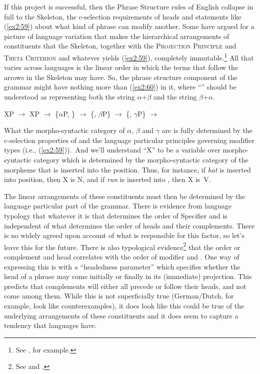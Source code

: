 If this project is successful, then the Phrase Structure rules of English collapse in full to the  Skeleton, the \mbox{c-selection} requirements of heads and statements like (\ref{ex2:59}) about what kind of phrase can modify another. Some have argued for a picture of language variation that makes the hierarchical arrangements of constituents that the  Skeleton, together with the \textsc{Projection Principle} and \textsc{Theta Criterion} and whatever yields (\ref{ex2:59}), completely immutable.\footnote{See \citet{Travis:1984}, for example.} All that varies across languages is the linear order in which the terms that follow the arrows in the  Skeleton may have. So, the phrase structure component of the grammar might have nothing more than (\ref{ex2:60}) in it, where ``\setof{$\alpha$, $\beta$}'' should be understood as representing both the string $\alpha$+$\beta$ and the string $\beta$+$\alpha$.
\begin{exe}
	\ex \label{ex2:60} 
	\begin{xlist}
	\ex XP $\rightarrow$ 
	\ex XP $\rightarrow$ \{$\alpha$P, \}
	\ex {} $\rightarrow$ \{, $\beta$P\}
	\ex {} $\rightarrow$ \{, $\gamma$P\}
	\ex {} $\rightarrow$ 
	\end{xlist}
\end{exe}
What the morpho-syntactic category of $\alpha$, $\beta$ and $\gamma$ are is fully determined by the \mbox{c-selection} properties of  and the language particular principles governing modifier types (i.e., (\ref{ex2:59})).\ And we'll understand ``X'' to be a variable over morpho-syntactic category which is determined by the morpho-syntactic category of the morpheme that is inserted into the  position. Thus, for instance, if \emph{hat} is inserted into  position, then X is N, and if \emph{run} is inserted into , then X is~V.

The linear arrangements of these constituents must then be determined by the language particular part of the grammar. There is evidence from language typology that whatever it is that determines the order of Specifier and  is independent of what determines the order of heads and their complements. There is no widely agreed upon account of what is responsible for this factor, so let's leave this for the future. There is also typological evidence\footnote{See \citet{Greenberg:1963} and \citet{Dryer:1992}.} that the order or complement and head correlates with the order of modifier and . One way of expressing this is with a ``headedness parameter'' which specifies whether the head of a phrase may come initially or finally in its (immediate) projection. This predicts that complements will either all precede or follow their heads, and not come among them. While this is not superficially true (German/Dutch, for example, look like counterexamples), it does look like this could be true of the underlying arrangements of these constituents and it does seem to capture a tendency that languages have.

